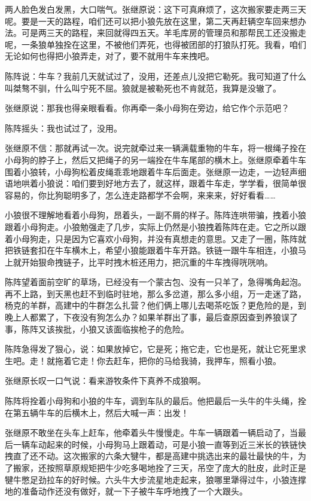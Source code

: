 \par 两人脸色发白发黑，大口喘气。张继原说：这下可真麻烦了，这次搬家要走两三天呢。要是一天的路程，咱们还可以把小狼先放在这里，第二天再赶辆空车回来想办法。可是两三天的路程，来回就得四五天。羊毛库房的管理员和那帮民工还没搬走呢，一条狼单独拴在这里，不被他们弄死，也得被团部的打狼队打死。我看，咱们无论如何也得把小狼弄走，对了，要不就用牛车来拽吧。
\par 陈阵说：牛车？我前几天就试过了，没用，还差点儿没把它勒死。我可知道了什么叫桀骜不驯，什么叫宁死不屈。狼就是被勒死也不肯就范，我算是没辙了。
\par 张继原说：那我也得亲眼看看。你再牵一条小母狗在旁边，给它作个示范吧？
\par 陈阵摇头：我也试过了，没用。
\par 张继原不信：那就再试一次。说完就牵过来一辆满载重物的牛车，将一根绳子拴在小母狗的脖子上，然后又把绳子的另一端拴在牛车尾部的横木上。张继原牵着牛车围着小狼转，小母狗松着皮绳乖乖地跟着牛车后面走。张继原一边走，一边轻声细语地哄着小狼说：咱们要到好地方去了，就这样，跟着牛车走，学学看，很简单很容易的，你比狗聪明多了，怎么连走路都学不会啊，来来来，好好看看……
\par 小狼很不理解地看着小母狗，昂着头，一副不屑的样子。陈阵连哄带骗，拽着小狼跟着小母狗走。小狼勉强走了几步，实际上仍然是小狼拽着陈阵在走。它之所以跟着小母狗走，只是因为它喜欢小母狗，并没有真想走的意思。又走了一圈，陈阵就把铁链套扣在牛车横木上，希望小狼能跟着牛车开路。铁链一跟牛车相连，小狼马上就开始狠命拽链子，比平时拽木桩还用力，把沉重的牛车拽得咣咣响。
\par 陈阵望着面前空旷的草场，已经没有一个蒙古包、没有一只羊了，急得嘴角起泡。再不上路，到天黑也赶不到临时驻地，那么多岔道，那么多小组，万一走迷了路，杨克的羊群，高建中的牛群怎么扎营？他们俩上哪儿去喝茶吃饭？更危险的是，到晚上人都累了，下夜没有狗怎么办？如果羊群出了事，最后查原因查到养狼误了事，陈阵又该挨批，小狼又该面临挨枪子的危险。
\par 陈阵急得发了狠心，说：如果放掉它，它是死；拖它走，它也是死，就让它死里求生吧。走！就拖着它走！你去赶车，把你的马给我骑，我押车，照看小狼。
\par 张继原长叹一口气说：看来游牧条件下真养不成狼啊。
\par 陈阵将拴着小母狗和小狼的牛车，调到车队的最后。他把最后一头牛的牛头绳，拴在第五辆牛车的后横木上，然后大喊一声：出发！
\par 张继原不敢坐在头车上赶车，他牵着头牛慢慢走。牛车一辆跟着一辆启动了，当最后一辆车动起来的时候，小母狗马上跟着动，可是小狼一直等到近三米长的铁链快拽直了还不动。这次搬家的六条大犍牛，都是高建中挑选出来的最壮最快的牛，为了搬家，还按照草原规矩把牛少吃多喝地拴了三天，吊空了庞大的肚皮，此时正是犍牛憋足劲拉车的好时候。六头牛大步流星地走起来，狼哪里犟得过牛，小狼连撑地的准备动作还没有做好，就一下子被牛车呼地拽了一个大跟头。
